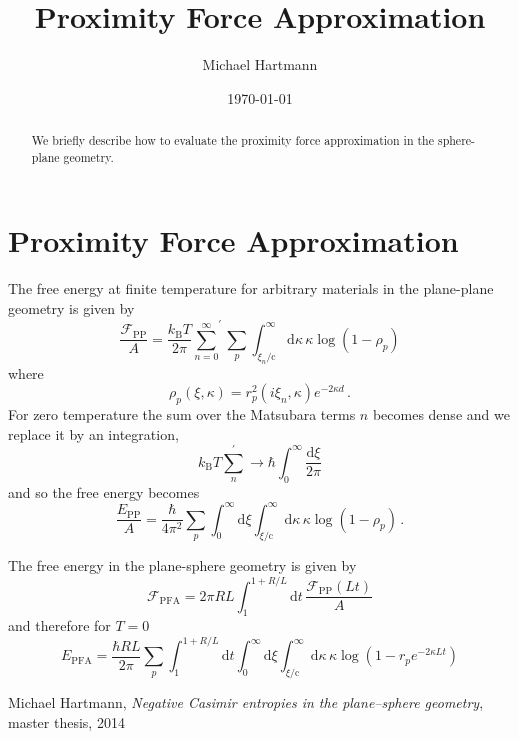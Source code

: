 \documentclass[twocolumn,superscriptaddress,prb]{revtex4-1}
\newcommand{\imag}{i} %
\newcommand{\e}{e}    %
\newcommand{\sol}{\mathrm{c}} %
\newcommand{\kb}{k_\mathrm{B}} %
\begin{document}
\title{Proximity Force Approximation}

\author{Michael Hartmann}

\date{\today}

\begin{abstract}
We briefly describe how to evaluate the proximity force approximation in the sphere-plane geometry.
\end{abstract}

\maketitle
\section{Proximity Force Approximation}

The free energy at finite temperature for arbitrary materials in the plane-plane geometry is given by\cite{hartmann}
\begin{equation}
\frac{\mathcal{F}_\text{PP}}{A} = \frac{\kb T}{2\pi} {\sum_{n=0}^\infty}^\prime \sum_p \int_{\xi_n/\sol}^\infty \mathrm{d}\kappa \, \kappa \log\left(1-\rho_p\right)
\end{equation}
where
\begin{equation}
\rho_p(\xi,\kappa) = r_p^2(\imag\xi_n,\kappa) \e^{-2\kappa d} \,.
\end{equation}
For zero temperature the sum over the Matsubara terms $n$ becomes dense and we
replace it by an integration,
\begin{equation}
\kb T \sum_n^\prime \to \hbar \int_0^\infty \frac{\mathrm{d}\xi}{2\pi}
\end{equation}
and so the free energy becomes
\begin{equation}
\frac{E_\text{PP}}{A} = \frac{\hbar}{4\pi^2} \sum_p \int_0^\infty \mathrm{d}\xi \int_{\xi/\sol}^\infty \mathrm{d}\kappa \, \kappa \log\left(1-\rho_p\right)\,.
\end{equation}

The free energy in the plane-sphere geometry is given by
\begin{equation}
\mathcal{F}_\text{PFA} = 2\pi RL \int_1^{1+R/L} \mathrm{d}t \, \frac{\mathcal{F}_\text{PP}(Lt)}{A}
\end{equation}
and therefore for $T=0$
\begin{equation}
E_\text{PFA} = \frac{\hbar RL}{2\pi} \sum_p \int_1^{1+R/L} \mathrm{d}t \int_0^\infty \mathrm{d}\xi \int_{\xi/\sol}^\infty \mathrm{d}\kappa \, \kappa \log\left(1-r_p \e^{-2\kappa L t}\right)
\end{equation}



\begin{thebibliography}{99}

  Michael Hartmann,
  \emph{Negative Casimir entropies in the plane–sphere geometry}, master thesis, 2014

\end{thebibliography}
\end{document}
